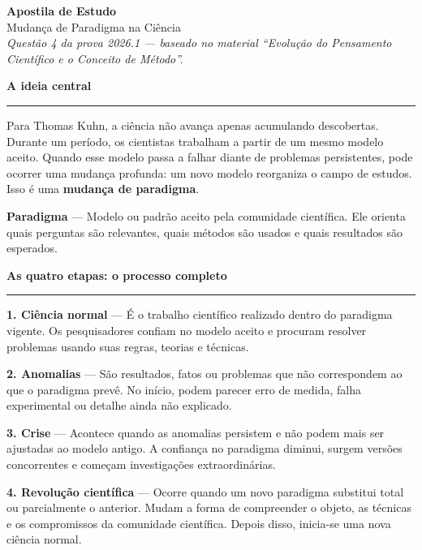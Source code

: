 \documentclass[11pt,a4paper]{article}
\newcommand{\termo}[2]{\vspace{0.25em}\noindent\colorbox{azulclaro}{\parbox{\dimexpr\linewidth-2\fboxsep}{\textbf{#1} --- #2}}\par\vspace{0.25em}}
\newcommand{\secao}[1]{\vspace{0.8em}\noindent\textcolor{azul}{\Large\textbf{#1}}\par\vspace{0.2em}\hrule\vspace{0.35em}}
\begin{document}
\begin{center}
{\LARGE\textbf{Apostila de Estudo}}\\[0.15cm]
{\Large\textcolor{azul}{Mudança de Paradigma na Ciência}}\\[0.2cm]
\textit{Questão 4 da prova 2026.1 --- baseado no material ``Evolução do Pensamento Científico e o Conceito de Método''.}
\end{center}

\secao{A ideia central}

Para Thomas Kuhn, a ciência não avança apenas acumulando descobertas. Durante um período, os cientistas trabalham a partir de um mesmo modelo aceito. Quando esse modelo passa a falhar diante de problemas persistentes, pode ocorrer uma mudança profunda: um novo modelo reorganiza o campo de estudos. Isso é uma \textbf{mudança de paradigma}.

\termo{Paradigma}{Modelo ou padrão aceito pela comunidade científica. Ele orienta quais perguntas são relevantes, quais métodos são usados e quais resultados são esperados.}

\secao{As quatro etapas: o processo completo}

\begin{center}
\end{center}

\termo{1. Ciência normal}{É o trabalho científico realizado dentro do paradigma vigente. Os pesquisadores confiam no modelo aceito e procuram resolver problemas usando suas regras, teorias e técnicas.}

\termo{2. Anomalias}{São resultados, fatos ou problemas que não correspondem ao que o paradigma prevê. No início, podem parecer erro de medida, falha experimental ou detalhe ainda não explicado.}

\termo{3. Crise}{Acontece quando as anomalias persistem e não podem mais ser ajustadas ao modelo antigo. A confiança no paradigma diminui, surgem versões concorrentes e começam investigações extraordinárias.}

\termo{4. Revolução científica}{Ocorre quando um novo paradigma substitui total ou parcialmente o anterior. Mudam a forma de compreender o objeto, as técnicas e os compromissos da comunidade científica. Depois disso, inicia-se uma nova ciência normal.}
\end{document}
